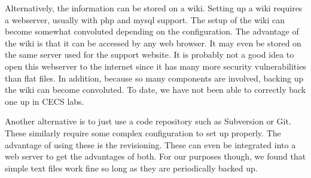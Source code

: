 Alternatively, the information can be stored on a wiki.  Setting up a wiki requires a webserver, usually with php and mysql support.  The setup of the wiki can become somewhat convoluted depending on the configuration.  The advantage of the wiki is that it can be accessed by any web browser.  It may even be stored on the same server used for the support website.  It is probably not a good idea to open this webserver to the internet since it has many more security vulnerabilities than flat files.  In addition, because so many components are involved, backing up the wiki can become convoluted.  To date, we have not been able to correctly back one up in CECS labs.  

Another alternative is to just use a code repository such as Subversion or Git.  These similarly require some complex configuration to set up properly.  The advantage of using these is the revisioning.  These can even be integrated into a web server to get the advantages of both.  For our purposes though, we found that simple text files work fine so long as they are periodically backed up.  
